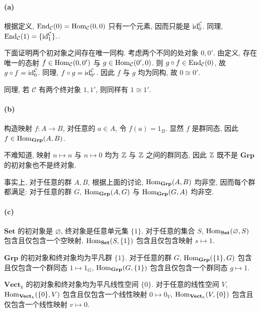 \documentclass{article}
\begin{document}
\begin{solution}
	\paragraph{(a)} 根据定义, $\operatorname{End}_{\mathcal{C}}(0) = \operatorname{Hom}_\mathcal{C}(0,0)$ 只有一个元素, 因而只能是 $\operatorname{id}_{0}^{\mathcal{C}}$. 同理, $\operatorname{End}_{\mathcal{C}}(1) = \{\operatorname{id}_{1}^{\mathcal{C}}\}.$. 
	
	下面证明两个初对象之间存在唯一同构. 考虑两个不同的处对象 $0,0'$. 由定义, 存在唯一的态射 $f \in \operatorname{Hom}_\mathcal{C}(0,0')$ 与 $g \in \operatorname{Hom}_\mathcal{C}(0',0)$. 则 $g \circ f \in \operatorname{End}_{\mathcal{C}}(0)$, 故 $g \circ f = \operatorname{id}_0^{\mathcal{C}}$. 同理, $f \circ g = \operatorname{id}_{0'}^{\mathcal{C}}$. 因此 $f$ 与 $g$ 均为同构, 故 $0 \cong 0'$.

	同理, 若 $\mathcal{C}$ 有两个终对象 $1, 1'$, 则同样有 $1 \cong 1'$. 

	\paragraph{(b)} 构造映射 $f: A \to B$, 对任意的 $a \in A$, 令 $f(a) = 1_B$. 显然 $f$ 是群同态, 因此 $f \in \operatorname{Hom}_{\mathbf{Grp}}(A,B)$. 

	不难知道, 映射 $n \mapsto n$ 与 $n \mapsto 0$ 均为 $\mathbb{Z}$ 与 $\mathbb{Z}$ 之间的群同态, 因此 $\mathbb{Z}$ 既不是 $\mathbf{Grp}$ 的初对象也不是终对象. 

	事实上, 对于任意的群 $A,B$, 根据上面的讨论, $\operatorname{Hom}_{\mathbf{Grp}}(A,B)$ 均非空, 因而每个群都满足: 对于任意的群 $G$, $\operatorname{Hom}_{\mathbf{Grp}}(A,G)$ 与 $\operatorname{Hom}_{\mathbf{Grp}}(G,A)$ 均非空.

	\paragraph{(c)} $\mathbf{Set}$ 的初对象是 $\varnothing$, 终对象是任意单元集 $\{1\}$. 对于任意的集合 $S$, $\operatorname{Hom}_{\mathbf{Set}}(\varnothing, S)$ 包含且仅包含一个空映射, $\operatorname{Hom}_{\mathbf{Set}}(S,\{1\})$ 包含且仅包含映射 $s \mapsto 1$. 

	$\mathbf{Grp}$ 的初对象和终对象均为平凡群 $\{1\}$. 对于任意的群 $G$, $\operatorname{Hom}_{\mathbf{Grp}}(\{1\}, G)$ 包含且仅包含一个群同态 $1 \mapsto 1_G$, $\operatorname{Hom}_{\mathbf{Grp}}(G, \{1\})$ 包含且仅包含一个群同态 $g \mapsto 1$. 

	$\mathbf{Vect}_k$ 的初对象和终对象均为平凡线性空间 $\{0\}$. 对于任意的线性空间 $V$, $\operatorname{Hom}_{\mathbf{Vect}_k}(\{0\}, V)$ 包含且仅包含一个线性映射 $0 \mapsto 0_V$, $\operatorname{Hom}_{\mathbf{Vect}_k	}(V, \{0\})$ 包含且仅包含一个线性映射 $v \mapsto 0$.


\end{solution}
\end{document}
